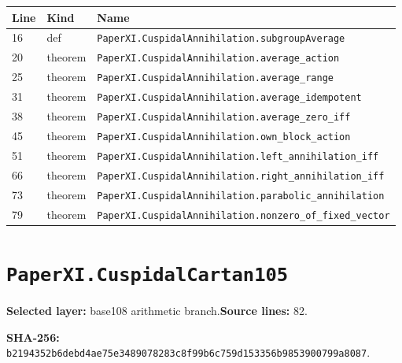 \documentclass[10pt,oneside]{book}
\begin{document}
\begin{longtable}{@{}p{}p{}p{}@{}}\toprule Line&Kind&Name\\\midrule\endhead

16&def&\nolinkurl{PaperXI.CuspidalAnnihilation.subgroupAverage}\\

20&theorem&\nolinkurl{PaperXI.CuspidalAnnihilation.average_action}\\

25&theorem&\nolinkurl{PaperXI.CuspidalAnnihilation.average_range}\\

31&theorem&\nolinkurl{PaperXI.CuspidalAnnihilation.average_idempotent}\\

38&theorem&\nolinkurl{PaperXI.CuspidalAnnihilation.average_zero_iff}\\

45&theorem&\nolinkurl{PaperXI.CuspidalAnnihilation.own_block_action}\\

51&theorem&\nolinkurl{PaperXI.CuspidalAnnihilation.left_annihilation_iff}\\

66&theorem&\nolinkurl{PaperXI.CuspidalAnnihilation.right_annihilation_iff}\\

73&theorem&\nolinkurl{PaperXI.CuspidalAnnihilation.parabolic_annihilation}\\

79&theorem&\nolinkurl{PaperXI.CuspidalAnnihilation.nonzero_of_fixed_vector}\\

\bottomrule\end{longtable}

\section{\texorpdfstring{\nolinkurl{PaperXI.CuspidalCartan105}}{PaperXI.CuspidalCartan105}}\label{module:PaperXI.CuspidalCartan105}

\textbf{Selected layer:} base108 arithmetic branch.\quad\textbf{Source lines:} 82.\par\textbf{SHA-256:} {\scriptsize\nolinkurl{b2194352b6debd4ae75e3489078283c8f99b6c759d153356b9853900799a8087}}.

\end{document}

